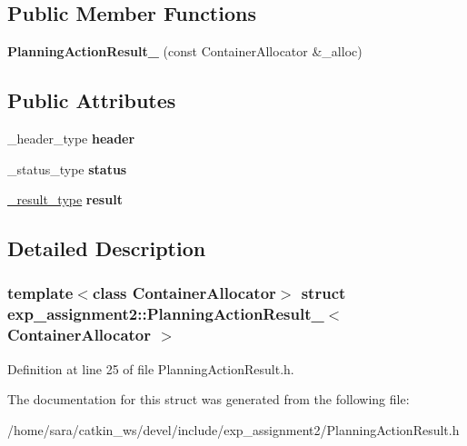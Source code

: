 \subsection*{Public Member Functions}
\begin{DoxyCompactItemize}
\item 
\mbox{\label{structexp__assignment2_1_1PlanningActionResult___adcb56bdfafc8906fdb8a41597b41cb1a}} 
{\bfseries Planning\+Action\+Result\+\_\+} (const Container\+Allocator \&\+\_\+alloc)
\end{DoxyCompactItemize}
\subsection*{Public Attributes}
\begin{DoxyCompactItemize}
\item 
\mbox{\label{structexp__assignment2_1_1PlanningActionResult___a819bd4790291868d6f334d7a2fc232c9}} 
\+\_\+header\+\_\+type {\bfseries header}
\item 
\mbox{\label{structexp__assignment2_1_1PlanningActionResult___ac7973b761f8961f0a462fbd346c06283}} 
\+\_\+status\+\_\+type {\bfseries status}
\item 
\mbox{\label{structexp__assignment2_1_1PlanningActionResult___a83d870f11825adfd29e31cd47e88b831}} 
\hyperlink{structexp__assignment2_1_1PlanningResult__}{\+\_\+result\+\_\+type} {\bfseries result}
\end{DoxyCompactItemize}


\subsection{Detailed Description}
\subsubsection*{template$<$class Container\+Allocator$>$\newline
struct exp\+\_\+assignment2\+::\+Planning\+Action\+Result\+\_\+$<$ Container\+Allocator $>$}



Definition at line 25 of file Planning\+Action\+Result.\+h.



The documentation for this struct was generated from the following file\+:\begin{DoxyCompactItemize}
\item 
/home/sara/catkin\+\_\+ws/devel/include/exp\+\_\+assignment2/Planning\+Action\+Result.\+h\end{DoxyCompactItemize}
